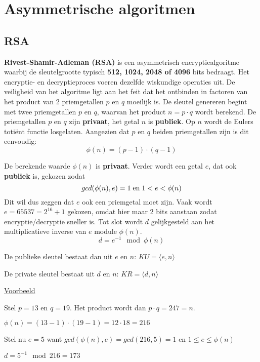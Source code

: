 \documentclass{report}
\begin{document}
	\section{Asymmetrische algoritmen}
	\subsection{RSA}
	\textbf{Rivest-Shamir-Adleman (RSA)} is een asymmetrisch encryptiealgoritme waarbij de sleutelgrootte typisch \textbf{512, 1024, 2048 of 4096} bits bedraagt. Het encryptie- en decryptieproces voeren dezelfde wiskundige operaties uit. De veiligheid van het algoritme ligt aan het feit dat het ontbinden in factoren van het product van 2 priemgetallen $p$ en $q$ moeilijk is. De sleutel genereren begint met twee priemgetallen $p$ en $q$, waarvan het product $n = p\cdot q$ wordt berekend. De priemgetallen $p$ en $q$ zijn \textbf{privaat}, het getal $n$ is \textbf{publiek}. Op $n$ wordt de Eulers totiënt functie losgelaten. Aangezien dat $p$ en $q$ beiden priemgetallen zijn is dit eenvoudig: $$\phi(n) = (p - 1) \cdot (q - 1)$$ 
	
	De berekende waarde $\phi(n)$ is \textbf{privaat}. Verder wordt een getal $e$, dat ook \textbf{publiek} is, gekozen zodat $$gcd(\phi(n), e) = 1 \;\hbox{en}\; 1 < e < \phi(n)$$
	Dit wil dus zeggen dat $e$ ook een priemgetal moet zijn. Vaak wordt $e = 65537 = 2^{16} + 1$ gekozen, omdat hier maar $2$ bits aanstaan zodat encryptie/decryptie sneller is.
	Tot slot wordt $d$ gelijkgesteld aan het multiplicatieve inverse van $e$ module $\phi(n)$.
	$$d = e^{-1} \mod \phi(n)$$

	De publieke sleutel bestaat dan uit $e$ en $n$: $KU=\langle e, n \rangle$

	De private sleutel bestaat uit $d$ en $n$: $KR=\langle d, n \rangle$

	\underline{Voorbeeld}

	Stel $p = 13$ en $q = 19$. Het product wordt dan $p \cdot q = 247 = n$.

	$\phi(n) = (13 - 1) \cdot (19 - 1) = 12 \cdot 18 = 216$

	Stel nu $e = 5$ want $gcd(\phi(n), e) = gcd(216, 5) = 1$ en $1 \leq e \leq \phi(n)$

	$d = 5^{-1} \mod 216 = 173$
\end{document}
